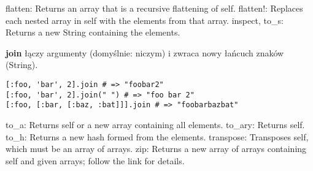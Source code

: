 {\footnotesize
flatten: Returns an array that is a recursive flattening of self.
flatten!: Replaces each nested array in self with the elements from that array.
inspect, to\_s: Returns a new String containing the elements.
}

\textbf{join} łączy argumenty (domyślnie: niczym) i zwraca nowy łańcuch znaków (String).
\begin{verbatim}
[:foo, 'bar', 2].join # => "foobar2"
[:foo, 'bar', 2].join(" ") # => "foo bar 2"
[:foo, [:bar, [:baz, :bat]]].join # => "foobarbazbat"
\end{verbatim}

{\footnotesize
to\_a: Returns self or a new array containing all elements.
to\_ary: Returns self.
to\_h: Returns a new hash formed from the elements.
transpose: Transposes self, which must be an array of arrays.
zip: Returns a new array of arrays containing self and given arrays; follow the link for details.
}